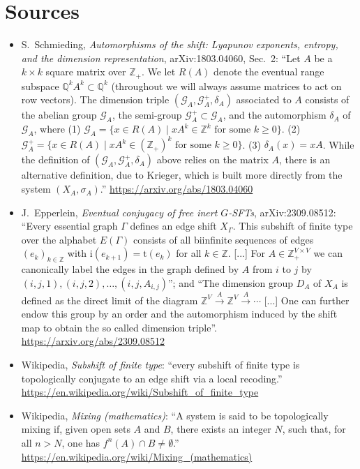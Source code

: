 \documentclass[11pt]{article}
\theoremstyle{definition}
\theoremstyle{remark}
\begin{document}
\section*{Sources}
\begin{itemize}
\item[{[S]}] S.~Schmieding, \emph{Automorphisms of the shift: Lyapunov exponents, entropy, and the
dimension representation}, arXiv:1803.04060, Sec.~2: ``Let $A$ be a $k\times k$ square matrix over
$\mathbb{Z}_{+}$. We let $R(A)$ denote the eventual range subspace $\mathbb{Q}^{k}A^{k}\subset
\mathbb{Q}^{k}$ (throughout we will always assume matrices to act on row vectors). The dimension
triple $(\mathcal{G}_{A},\mathcal{G}_{A}^{+},\delta_{A})$ associated to $A$ consists of the abelian
group $\mathcal{G}_{A}$, the semi-group $\mathcal{G}_{A}^{+}\subset\mathcal{G}_{A}$, and the
automorphism $\delta_{A}$ of $\mathcal{G}_{A}$, where (1)
$\mathcal{G}_{A}=\{x\in R(A)\mid xA^{k}\in\mathbb{Z}^{k}\text{ for some }k\geq 0\}$. (2)
$\mathcal{G}_{A}^{+}=\{x\in R(A)\mid xA^{k}\in(\mathbb{Z}_{+})^{k}\text{ for some }k\geq 0\}$. (3)
$\delta_{A}(x)=xA$. While the definition of $(\mathcal{G}_{A},\mathcal{G}_{A}^{+},\delta_{A})$ above
relies on the matrix $A$, there is an alternative definition, due to Krieger, which is built more
directly from the system $(X_{A},\sigma_{A})$.'' \url{https://arxiv.org/abs/1803.04060}
\item[{[E]}] J.~Epperlein, \emph{Eventual conjugacy of free inert $G$-SFTs}, arXiv:2309.08512:
``Every essential graph $\Gamma$ defines an edge shift $X_{\Gamma}$. This subshift of finite type over
the alphabet $E(\Gamma)$ consists of all biinfinite sequences of edges $(e_{k})_{k\in\mathbb{Z}}$ with
$\mathrm{i}(e_{k+1})=\mathrm{t}(e_{k})$ for all $k\in\mathbb{Z}$. [...] For
$A\in\mathbb{Z}_{+}^{V\times V}$ we can canonically label the edges in the graph defined by $A$ from
$i$ to $j$ by $(i,j,1),(i,j,2),\dots,(i,j,A_{i,j})$''; and ``The dimension group $D_A$ of $X_A$ is
defined as the direct limit of the diagram $\mathbb{Z}^V\xrightarrow{A}\mathbb{Z}^V\xrightarrow{A}
\cdots$ [...] One can further endow this group by an order and the automorphism induced by the shift
map to obtain the so called dimension triple''. \url{https://arxiv.org/abs/2309.08512}
\item[{[W1]}] Wikipedia, \emph{Subshift of finite type}: ``every subshift of finite type is
topologically conjugate to an edge shift via a local recoding.''
\url{https://en.wikipedia.org/wiki/Subshift_of_finite_type}
\item[{[W2]}] Wikipedia, \emph{Mixing (mathematics)}: ``A system is said to be topologically mixing if,
given open sets $A$ and $B$, there exists an integer $N$, such that, for all $n>N$, one has
$f^n(A)\cap B\neq\emptyset$.'' \url{https://en.wikipedia.org/wiki/Mixing_(mathematics)}
\end{itemize}
\end{document}
